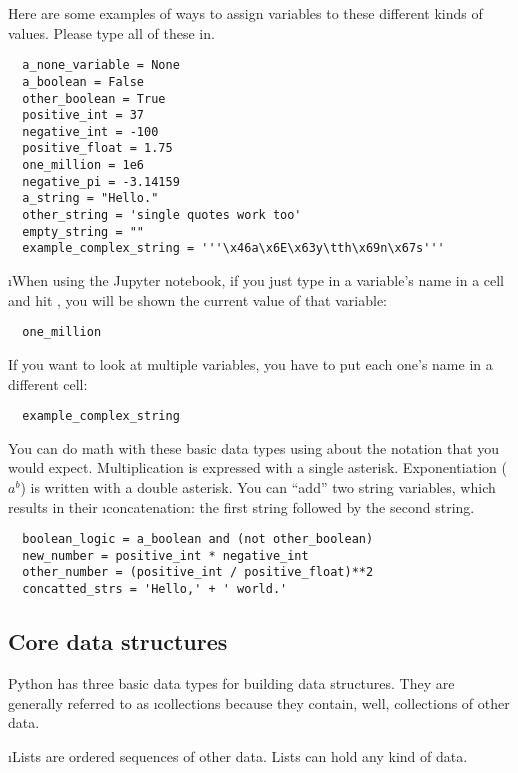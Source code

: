 \documentclass[letterpaper, 12pt, titlepage, twoside]{article}
\begin{document}
Here are some examples of ways to assign variables to these different kinds of
values. Please type all of these in.

\begin{lstlisting}
  a_none_variable = None
  a_boolean = False
  other_boolean = True
  positive_int = 37
  negative_int = -100
  positive_float = 1.75
  one_million = 1e6
  negative_pi = -3.14159
  a_string = "Hello."
  other_string = 'single quotes work too'
  empty_string = ""
  example_complex_string = '''\x46a\x6E\x63y\tth\x69n\x67s'''
\end{lstlisting}

\i{When using the Jupyter notebook}, if you just type in a variable's name in
a cell and hit , you will be shown the current value of that
variable:

\begin{lstlisting}
  one_million
\end{lstlisting}

If you want to look at multiple variables, you have to put each one's name in
a different cell:

\begin{lstlisting}
  example_complex_string
\end{lstlisting}

You can do math with these basic data types using about the notation that you
would expect. Multiplication is expressed with a single asterisk.
Exponentiation ($a^b$) is written with a double asterisk. You can ``add'' two
string variables, which results in their \i{concatenation}: the first string
followed by the second string.

\begin{lstlisting}
  boolean_logic = a_boolean and (not other_boolean)
  new_number = positive_int * negative_int
  other_number = (positive_int / positive_float)**2
  concatted_strs = 'Hello,' + ' world.'
\end{lstlisting}

\subsection*{Core data structures}

Python has three basic data types for building data structures. They are
generally referred to as \i{collections} because they contain, well,
collections of other data.

\i{Lists} are
ordered sequences of other data. Lists can hold any kind of data.
\end{document}
